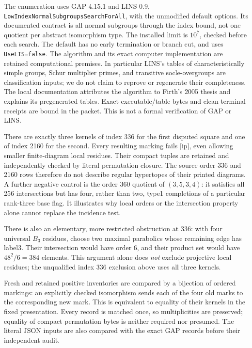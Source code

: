 \documentclass[11pt]{article}
\begin{document}
The enumeration uses GAP 4.15.1 and LINS 0.9,
\texttt{LowIndexNormalSubgroupsSearchForAll}, with the unmodified default
options. Its documented contract is all normal subgroups through the
index bound, not one quotient per abstract isomorphism type. The installed
limit is $10^7$, checked before each search. The default has no early
termination or branch cut, and uses \texttt{UseLIS=false}. The algorithm
and its exact computer implementation are retained computational premises.
In particular LINS's tables of characteristically simple groups, Schur
multiplier primes, and transitive socle-overgroups are classification
inputs; we do not claim to reprove or regenerate their completeness.
The local documentation attributes the algorithm to Firth's 2005 thesis
and explains its pregenerated tables. Exact executable/table bytes and
clean terminal receipts are bound in the packet. This is not a formal
verification of GAP or LINS.

There are exactly three kernels of index 336 for the first disputed square
and one of index 2160 for the second. Every resulting marking fails
\eqref{ip}, even allowing smaller finite-diagram local residues.
Their compact tuples are retained and independently checked by literal
permutation closure. The source order $336$ and 2160 rows therefore do not
describe regular hypertopes of their printed diagrams. A further negative
control is the order $360$ quotient of $(3,5,3,4)$: it satisfies all 256
intersections but has four, rather than two, type1 completions of a
particular rank-three base flag. It illustrates why local orders or the
intersection property alone cannot replace the incidence test.

There is also an elementary, more restricted obstruction at 336: with
four universal $B_3$ residues, choose two maximal parabolics whose
remaining edge has label3. Their intersection would have order 6, and
their product set would have $48^2/6=384$ elements. This argument alone
does \emph{not} exclude projective local residues; the unqualified
index 336 exclusion above uses all three kernels.

Fresh and retained positive inventories are compared by a bijection of
ordered markings: an explicitly checked isomorphism sends each of the four
old marks to the corresponding new mark. This is equivalent to equality
of their kernels in the fixed presentation. Every record is matched once,
so multiplicities are preserved; equality of compact permutation bytes
is neither required nor presumed. The literal JSON inputs are also compared
with the exact GAP records before their independent audit.
\end{document}
